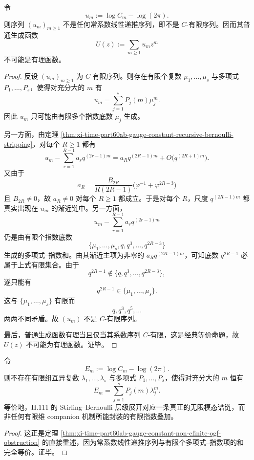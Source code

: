\begin{theorem}\label{thm:xi-time-part60ab-gauge-constant-non-cfinite-ogf-obstruction}
令
\[
u_m:=\log C_m-\log(2\pi).
\]
则序列 \((u_m)_{m\ge 1}\) 不是任何常系数线性递推序列，即不是 \(C\)-有限序列。因而其普通生成函数
\[
U(z):=\sum_{m\ge 1}u_m z^m
\]
不可能是有理函数。
\end{theorem}
\begin{proof}
反设 \((u_m)_{m\ge 1}\) 为 \(C\)-有限序列。则存在有限个复数 \(\mu_1,\dots,\mu_s\) 与多项式 \(P_1,\dots,P_s\)，使得对充分大的 \(m\) 有
\[
u_m=\sum_{j=1}^{s}P_j(m)\mu_j^m.
\]
因此 \(u_m\) 只可能由有限多个指数底数 \(\mu_j\) 生成。

另一方面，由定理 \ref{thm:xi-time-part60ab-gauge-constant-recursive-bernoulli-stripping}，对每个 \(R\ge 1\) 都有
\[
u_m-\sum_{r=1}^{R-1}a_r q^{(2r-1)m}
=
a_R q^{(2R-1)m}+O\!\bigl(q^{(2R+1)m}\bigr).
\]
又由于
\[
a_R=
\frac{B_{2R}}{R(2R-1)}
\bigl(\varphi^{-1}+\varphi^{2R-3}\bigr)
\]
且 \(B_{2R}\neq 0\)，故 \(a_R\neq 0\) 对每个 \(R\ge 1\) 都成立。于是对每个 \(R\)，尺度 \(q^{(2R-1)m}\) 都真实出现在 \(u_m\) 的渐近链中。另一方面，
\[
u_m-\sum_{r=1}^{R-1}a_r q^{(2r-1)m}
\]
仍是由有限个指数底数
\[
\{\mu_1,\dots,\mu_s,q,q^3,\dots,q^{2R-3}\}
\]
生成的多项式--指数和。由其渐近主项为非零的 \(a_R q^{(2R-1)m}\)，可知底数 \(q^{2R-1}\) 必属于上式有限集合。由于
\[
q^{2R-1}\notin \{q,q^3,\dots,q^{2R-3}\},
\]
遂只能有
\[
q^{2R-1}\in \{\mu_1,\dots,\mu_s\}.
\]
这与 \(\{\mu_1,\dots,\mu_s\}\) 有限而
\[
q,q^3,q^5,\dots
\]
两两不同矛盾。故 \((u_m)\) 不是 \(C\)-有限序列。

最后，普通生成函数有理当且仅当其系数序列 \(C\)-有限，这是经典等价命题，故 \(U(z)\) 不可能为有理函数。证毕。
\end{proof}

\begin{corollary}\label{cor:xi-time-part60ab-gauge-constant-infinite-modal-obstruction}
令
\[
E_m:=\log C_m-\log(2\pi).
\]
则不存在有限组互异复数 \(\lambda_1,\dots,\lambda_s\) 与多项式 \(P_1,\dots,P_s\)，使得对充分大的 \(m\) 恒有
\[
E_m=\sum_{j=1}^{s}P_j(m)\lambda_j^m.
\]
等价地，H.111 的 Stirling--Bernoulli 层级展开对应一条真正的无限模态谱链，而非任何有限维 companion 机制所能封装的有限指数叠加。
\end{corollary}
\begin{proof}
这正是定理 \ref{thm:xi-time-part60ab-gauge-constant-non-cfinite-ogf-obstruction} 的直接重述，因为常系数线性递推序列与有限个多项式--指数项的和完全等价。证毕。
\end{proof}

